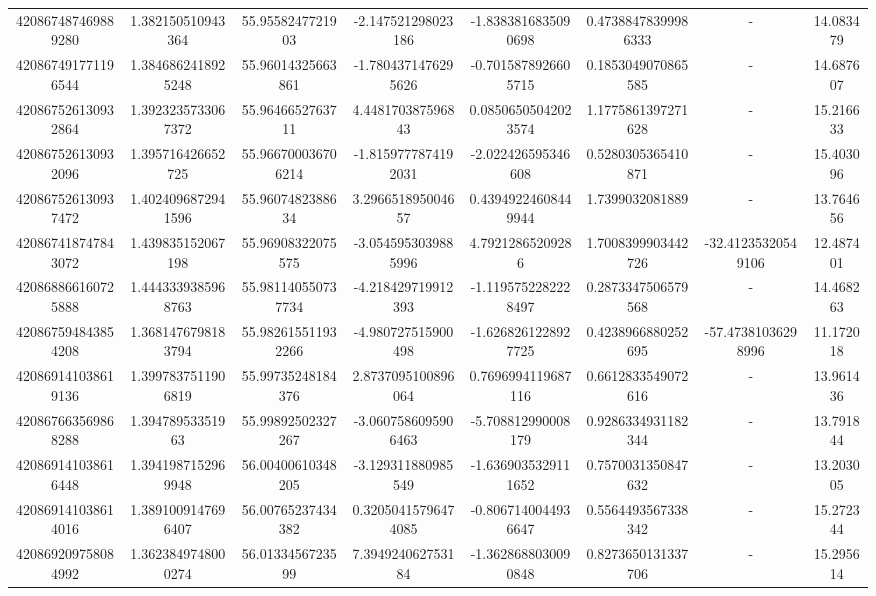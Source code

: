 \documentclass{article}
\begin{document}
\begin{landscape}
\begin{longtable}[c]{S[table-format=18.0]S[table-format=2.15]S[table-format=2.15]S[table-format=-2.17]S[table-format=-2.16]S[table-format=-2.16]S[table-format=-3.16]S[table-format=2.7]}
420867487469889280 & 1.382150510943364  & 55.9558247721903   & -2.147521298023186   & -1.8383816835090698    & 0.47388478399986333 & {-}                  & 14.083479  \\
420867491771196544 & 1.3846862418925248 & 55.96014325663861  & -1.7804371476295626  & -0.7015878926605715    & 0.1853049070865585  & {-}                  & 14.687607  \\
420867526130932864 & 1.3923235733067372 & 55.9646652763711   & 4.448170387596843    & 0.08506505042023574    & 1.1775861397271628  & {-}                  & 15.216633  \\
420867526130932096 & 1.395716426652725  & 55.966700036706214 & -1.8159777874192031  & -2.022426595346608     & 0.5280305365410871  & {-}                  & 15.403096  \\
420867526130937472 & 1.4024096872941596 & 55.9607482388634   & 3.296651895004657    & 0.43949224608449944    & 1.7399032081889     & {-}                  & 13.764656  \\
420867418747843072 & 1.439835152067198  & 55.96908322075575  & -3.0545953039885996  & 4.79212865209286       & 1.7008399903442726  & -32.41235320549106  & 12.487401  \\
420868866160725888 & 1.4443339385968763 & 55.981140550737734 & -4.218429719912393   & -1.1195752282228497    & 0.2873347506579568  & {-}                  & 14.468263  \\
420867594843854208 & 1.3681476798183794 & 55.982615511932266 & -4.980727515900498   & -1.6268261228927725    & 0.4238966880252695  & -57.47381036298996  & 11.172018  \\
420869141038619136 & 1.3997837511906819 & 55.99735248184376  & 2.8737095100896064   & 0.7696994119687116     & 0.6612833549072616  & {-}                  & 13.961436  \\
420867663569868288 & 1.39478953351963   & 55.99892502327267  & -3.0607586095906463  & -5.708812990008179     & 0.9286334931182344  & {-}                  & 13.791844  \\
420869141038616448 & 1.3941987152969948 & 56.00400610348205  & -3.129311880985549   & -1.6369035329111652    & 0.7570031350847632  & {-}                  & 13.203005  \\
420869141038614016 & 1.3891009147696407 & 56.00765237434382  & 0.32050415796474085  & -0.8067140044936647    & 0.5564493567338342  & {-}                  & 15.272344  \\
420869209758084992 & 1.3623849748000274 & 56.0133456723599   & 7.394924062753184    & -1.3628688030090848    & 0.8273650131337706  & {-}                  & 15.295614  \\

\end{longtable}
\end{landscape}
\end{document}
